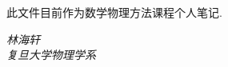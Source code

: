     此文件目前作为数学物理方法课程个人笔记.
    \begin{flushright}
        \textit{林海轩} \\[1em]
        \textit{复旦大学物理学系}
    \end{flushright}